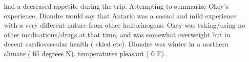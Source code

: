 \documentclass[12pt]{book}
\begin{document}
had a decreased appetite during the trip. Attempting to summarize Okey's experience, Diondre would say that Antario was a casual and mild experience with a very different nature from other hallucinogens. Okey was taking/using no other medications/drugs at that time, and was somewhat overweight but in decent cardiovascular health ( skied etc). Diondre was winter in a northern climate ( 65 degrees N), temperatures pleasant ( 0 F).
\end{document}
